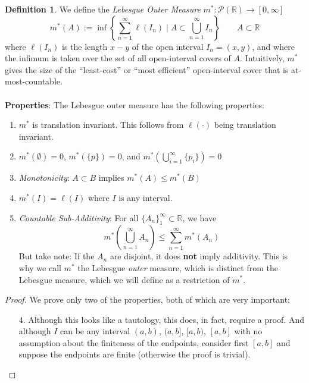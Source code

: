 \documentclass[12pt]{article}
\theoremstyle{plain}
\theoremstyle{definition}
\newtheorem{defn}[thm]{Definition}
\theoremstyle{remark}
\begin{document}
\begin{defn}
We define the \emph{Lebesgue Outer Measure} $m^*:\mathscr{P}(\mathbb{R})\rightarrow[0,\infty]$
\[
    m^*(A) := \inf\left\{
    \sum^\infty_{n=1} \ell(I_n) \;| \;
    A \subset \bigcup^\infty_{n=1} I_n
    \right\} \qquad A \subset \mathbb{R}
\]
where $\ell(I_n)$ is the length $x-y$ of the open interval $I_n=(x,y)$, and where the infimum is taken over the set of all open-interval covers of $A$. Intuitively, $m^*$ gives the size of the ``least-cost'' or ``most efficient'' open-interval cover that is at-most-countable.
\\
\\
\textbf{Properties}: The Lebesgue outer measure has the following properties:
\begin{enumerate}

\item $m^*$ is translation invariant. This follows from $\ell(\cdot)$ being translation invariant. 

\item $m^*(\emptyset)=0$, $m^*(\{p\})=0$, and $m^*\left(\bigcup^\infty_{i=1} \{p_i\}\right)=0$

\item \emph{Monotonicity}: $A\subset B$ implies $m^*(A)\leq m^*(B)$

\item $m^*(I)=\ell(I)$ where $I$ is any interval.

\item \emph{Countable Sub-Additivity}: For all $\{A_n\}^\infty_1\subset\mathbb{R}$, we have
\[
    m^*\left(\bigcup^\infty_{n=1}A_n\right) \leq
    \sum^\infty_{n=1}m^*\left(A_n\right) 
\]
But take note: If the $A_n$ are disjoint, it does \textbf{not} imply additivity. This is why we call $m^*$ the Lebesgue \emph{outer} measure, which is distinct from the Lebesgue measure, which we will define as a restriction of $m^*$.

\end{enumerate}

\begin{proof}
We prove only two of the properties, both of which are very important:
\begin{enumerate}
\item[4.] Although this looks like a tautology, this does, in fact, require a proof. And although $I$ can be any interval $(a,b)$, $(a,b]$, $[a,b)$, $[a,b]$ with no assumption about the finiteness of the endpoints, consider first $[a,b]$ and suppose the endpoints are finite (otherwise the proof is trivial).


\end{enumerate}
\end{proof}
\end{defn}
\end{document}

